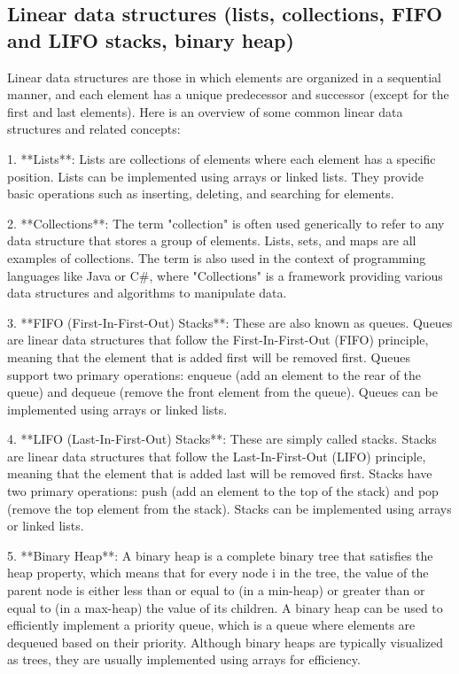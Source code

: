 \documentclass{article}
\begin{document}
\subsection{Linear data structures (lists, collections, FIFO and LIFO stacks, binary heap)}

Linear data structures are those in which elements are organized in a sequential manner, and each element has a unique predecessor and successor (except for the first and last elements). Here is an overview of some common linear data structures and related concepts:

1. **Lists**: Lists are collections of elements where each element has a specific position. Lists can be implemented using arrays or linked lists. They provide basic operations such as inserting, deleting, and searching for elements.

2. **Collections**: The term "collection" is often used generically to refer to any data structure that stores a group of elements. Lists, sets, and maps are all examples of collections. The term is also used in the context of programming languages like Java or C#, where "Collections" is a framework providing various data structures and algorithms to manipulate data.

3. **FIFO (First-In-First-Out) Stacks**: These are also known as queues. Queues are linear data structures that follow the First-In-First-Out (FIFO) principle, meaning that the element that is added first will be removed first. Queues support two primary operations: enqueue (add an element to the rear of the queue) and dequeue (remove the front element from the queue). Queues can be implemented using arrays or linked lists.

4. **LIFO (Last-In-First-Out) Stacks**: These are simply called stacks. Stacks are linear data structures that follow the Last-In-First-Out (LIFO) principle, meaning that the element that is added last will be removed first. Stacks have two primary operations: push (add an element to the top of the stack) and pop (remove the top element from the stack). Stacks can be implemented using arrays or linked lists.

5. **Binary Heap**: A binary heap is a complete binary tree that satisfies the heap property, which means that for every node i in the tree, the value of the parent node is either less than or equal to (in a min-heap) or greater than or equal to (in a max-heap) the value of its children. A binary heap can be used to efficiently implement a priority queue, which is a queue where elements are dequeued based on their priority. Although binary heaps are typically visualized as trees, they are usually implemented using arrays for efficiency.
\end{document}
